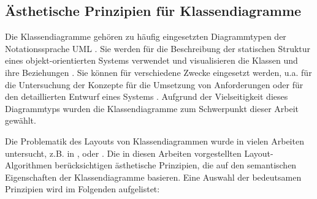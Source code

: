 \subsection{Ästhetische Prinzipien für Klassendiagramme}
\label{subsec:aesthetics-criteria-class-diagrams}

Die Klassendiagramme gehören zu häufig eingesetzten Diagrammtypen der Notationssprache UML \cite{Fowler03UML-Distilled:}. Sie werden für die Beschreibung der statischen Struktur eines objekt-orientierten Systems verwendet und visualisieren die Klassen und ihre Beziehungen \cite{Siebenhaller03Automatisches, Ambler05The-Elements}. Sie können für verschiedene Zwecke eingesetzt werden, u.a. für die Untersuchung der Konzepte für die Umsetzung von Anforderungen oder für den detaillierten Entwurf eines Systems \cite{Ambler04UML-2-Class, Ambler05The-Elements}. Aufgrund der Vielseitigkeit dieses Diagrammtyps wurden die Klassendiagramme zum Schwerpunkt dieser Arbeit gewählt.

Die Problematik des Layouts von Klassendiagrammen wurde in vielen Arbeiten untersucht, z.B. in \cite{Siebenhaller03Automatisches}, \cite{Eichelberger05Aesthetics} oder \cite{Eiglsperger04Automatic}. Die in diesen Arbeiten vorgestellten Layout-Algorithmen berücksichtigen ästhetische Prinzipien, die auf den semantischen Eigenschaften der Klassendiagramme basieren. Eine Auswahl der bedeutsamen Prinzipien wird im Folgenden aufgelistet:

